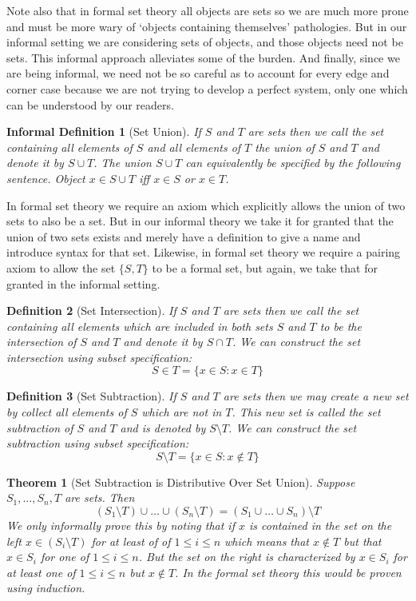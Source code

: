 \documentclass[12pt]{article}
\theoremstyle{break}
\newtheorem{definition}{Definition}[section]
\theoremstyle{break}
\newtheorem{theorem}{Theorem}[section]
\theoremstyle{break}
\theoremstyle{break}
\theoremstyle{break}
\newtheorem{informal definition}[definition]{Informal Definition}
\begin{document}
Note also that in formal set theory all objects are sets so we are much more prone and must be more wary of `objects containing themselves' pathologies.
But in our informal setting we are considering sets of objects, and those objects need not be sets.
This informal approach alleviates some of the burden.
And finally, since we are being informal, we need not be so careful as to account for every edge and corner case because we are not trying to develop a perfect system, only one which can be understood by our readers.

\begin{informal definition}[Set Union]
If $S$ and $T$ are sets then we call the set containing all elements of $S$ and all elements of $T$ the union of $S$ and $T$ and denote it by $S\cup T$.
The union $S\cup T$ can equivalently be specified by the following sentence.
Object $x\in S\cup T$ iff $x \in S$ or $x\in T$.
\end{informal definition}
In formal set theory we require an axiom which explicitly allows the union of two sets to also be a set.
But in our informal theory we take it for granted that the union of two sets exists and merely have a definition to give a name and introduce syntax for that set.
Likewise, in formal set theory we require a pairing axiom to allow the set $\{S, T\}$ to be a formal set, but again, we take that for granted in the informal setting.

\begin{definition}[Set Intersection]
If $S$ and $T$ are sets then we call the set containing all elements which are included in both sets $S$ and $T$ to be the intersection of $S$ and $T$ and denote it by $S\cap T$.
We can construct the set intersection using subset specification:
$$
S\in T = \{x\in S: x\in T\}
$$
\end{definition}

\begin{definition}[Set Subtraction]
If $S$ and $T$ are sets then we may create a new set by collect all elements of $S$ which are not in $T$.
This new set is called the set subtraction of $S$ and $T$ and is denoted by $S\setminus T$.
We can construct the set subtraction using subset specification:
$$
S\setminus T = \{x\in S: x \not \in T\}
$$
\end{definition}

\begin{theorem}[Set Subtraction is Distributive Over Set Union]
Suppose $S_1,\ldots, S_n, T$ are sets.
Then
$$
(S_1\setminus T)\cup \ldots \cup (S_n\setminus T) = (S_1\cup\ldots \cup S_n)\setminus T
$$
We only informally prove this by noting that if $x$ is contained in the set on the left $x\in (S_i\setminus T)$ for at least of of $1\le i \le n$ which means that $x\not \in T$ but that $x\in S_i$ for one of $1\le i \le n$.
But the set on the right is characterized by $x\in S_i$ for at least one of $1 \le i \le n$ but $x\not \in T$.
In the formal set theory this would be proven using induction.
\end{theorem}
\end{document}
